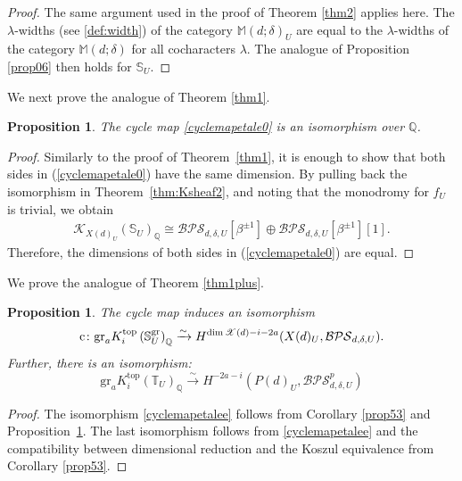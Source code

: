 \documentclass [11pt,oneside,a4paper,mathscr]{amsart}
\newtheorem{prop}[thm]{Proposition}
\theoremstyle{definition}
\begin{document}
\begin{proof}
    The same argument used in the proof of Theorem \ref{thm2} applies here. The $\lambda$-widths (see \eqref{def:width}) of the category $\mathbb{M}(d; \delta)_U$ are equal to the $\lambda$-widths of the category $\mathbb{M}(d; \delta)$ for all cocharacters $\lambda$. 
    The analogue of Proposition \ref{prop06} then holds for
    $\mathbb{S}_U$. 
    \end{proof}

We next prove the analogue of Theorem \ref{thm1}.


\begin{prop}\label{propthm1plus}
    The cycle map \eqref{cyclemapetale0} is an isomorphism over $\mathbb{Q}$.
\end{prop}
\begin{proof}
    Similarly to the proof of Theorem~\ref{thm1}, it is enough to show that both 
    sides in (\ref{cyclemapetale0}) have the same dimension. 
    By pulling back the isomorphism in Theorem~\ref{thm:Ksheaf2}, and noting 
    that the monodromy for $f_U$ is trivial, we obtain 
    \begin{align*}
        \mathcal{K}_{X(d)_U}(\mathbb{S}_U)_{\mathbb{Q}} \cong 
        \mathcal{BPS}_{d, \delta, U}[\beta^{\pm 1}] \oplus 
        \mathcal{BPS}_{d, \delta, U}[\beta^{\pm 1}][1]. 
    \end{align*}
    Therefore, the dimensions of both sides in (\ref{cyclemapetale0}) are equal. 
\end{proof}



We prove the analogue of Theorem \ref{thm1plus}.

\begin{prop}\label{prop98}
The cycle map induces an isomorphism 
\begin{equation}\label{cyclemapetalee}
\mathrm{c}\colon \mathrm{gr}_a K^{\mathrm{top}}_i\left(\mathbb{S}_U^{\rm{gr}}\right)_{\mathbb{Q}}
\xrightarrow{\sim} H^{\dim \mathscr{X}(d)-i-2a}(X(d)_U, \mathcal{BPS}_{d,\delta,U}).
\end{equation}
Further, there is an isomorphism:
\[\mathrm{gr}_a K^{\mathrm{top}}_i(\mathbb{T}_U)_{\mathbb{Q}}\xrightarrow{\sim} 
         H^{-2a-i}(P(d)_U, \mathcal{BPS}^p_{d,\delta,U})\]
\end{prop}

\begin{proof}
    The isomorphism \eqref{cyclemapetalee} follows from Corollary \ref{prop53}
    and Proposition~\ref{propthm1plus}.  The last isomorphism follows from \eqref{cyclemapetalee} and the compatibility between dimensional reduction and the Koszul equivalence from Corollary \ref{prop53}. 
\end{proof}
\end{document}
